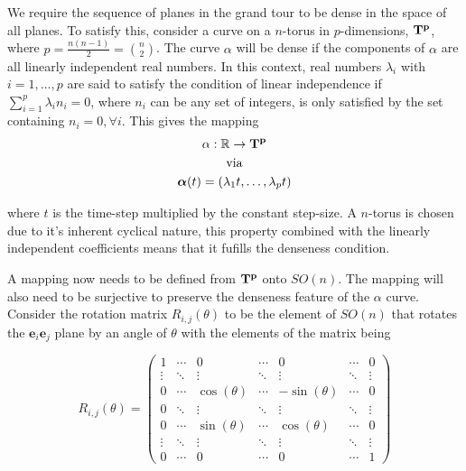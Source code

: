 \documentclass[a4paper,11pt,twoside]{article}
\begin{document}
We require the sequence of planes in the grand tour to be dense in the space of all planes. To satisfy this, consider a curve on a $n$-torus in $p$-dimensions, $\bf{T}^p$, where $p=\frac{n(n-1)}{2}={n \choose 2} $. The curve $\alpha$ will be dense if the components of $\alpha$ are all linearly independent real numbers. In this context, real numbers $\lambda_i$ with  $i=1,\dotsc,p$ are said to satisfy the condition of linear independence if $\sum_{i=1}^p \lambda_i n_i=0$, where $n_i$ can be any set of integers, is only satisfied by the set containing $n_i=0, \forall i$. This gives the mapping
\begin{equation}
\begin{gathered}
\alpha: \mathbb R \rightarrow \bf{T}^p
\\
\text{via}
\\
\bm{\alpha}(t)=(\lambda_1 t,\dotsc, \lambda_p t)
\end{gathered}
\end{equation}

where $t$ is the time-step multiplied by the constant step-size. A $n$-torus is chosen due to it's inherent cyclical nature, this property combined with the linearly independent coefficients means that it fufills the denseness condition.
\newline

A mapping now needs to be defined from $\bf{T}^p$ onto $SO(n)$. The mapping will also need to be surjective to preserve the denseness feature of the $\alpha$ curve. Consider the rotation matrix $R_{i,j}(\theta)$ to be the element of $SO(n)$ that rotates the $\bm{e}_i \bm{e}_j$ plane by an angle of $\theta$ with the elements of the matrix being

\begin{equation}
R_{i,j}(\theta) = 
\begin{pmatrix}
  1 &  \cdots & 0 & \cdots & 0 & \cdots &  0 \\
  \vdots  &  \ddots & \vdots& \ddots &\vdots&\ddots&\vdots  \\
  0 & \cdots & \cos{(\theta)} & \cdots & -\sin{(\theta)} &  \cdots & 0 \\
  0&\ddots&\vdots&\ddots&\vdots&\ddots&\vdots\\
  0 &  \cdots & \sin{(\theta)}&\cdots & \cos{(\theta)} &  \cdots & 0 \\
  \vdots  &  \ddots & \vdots&\ddots& \vdots &\ddots&\vdots  \\
  0 & \cdots & 0 & \cdots&0 & \cdots & 1
 \end{pmatrix}
\end{equation}
\end{document}
